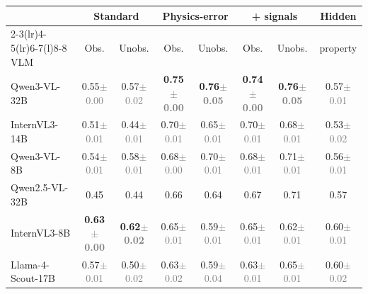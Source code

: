 \begin{table}[t]
    \centering
    \footnotesize
    \setlength{\tabcolsep}{3pt}
    \begin{tabular}{@{}lccccccc@{}}
        \toprule
        & \multicolumn{2}{c}{Standard} & \multicolumn{2}{c}{Physics-error} & \multicolumn{2}{c}{+ signals} & Hidden \\
        \cmidrule(lr){2-3}\cmidrule(lr){4-5}\cmidrule(lr){6-7}\cmidrule(l){8-8}
        VLM & Obs. & Unobs. & Obs. & Unobs. & Obs. & Unobs. & property \\
        \midrule
        Qwen3-VL-32B & 0.55{\scriptsize\textcolor{gray}{$\pm$0.00}} & 0.57{\scriptsize\textcolor{gray}{$\pm$0.02}} & \textbf{0.75{\scriptsize\textcolor{gray}{$\pm$0.00}}} & \textbf{0.76{\scriptsize\textcolor{gray}{$\pm$0.05}}} & \textbf{0.74{\scriptsize\textcolor{gray}{$\pm$0.00}}} & \textbf{0.76{\scriptsize\textcolor{gray}{$\pm$0.05}}} & 0.57{\scriptsize\textcolor{gray}{$\pm$0.01}} \\
        InternVL3-14B & 0.51{\scriptsize\textcolor{gray}{$\pm$0.01}} & 0.44{\scriptsize\textcolor{gray}{$\pm$0.01}} & 0.70{\scriptsize\textcolor{gray}{$\pm$0.01}} & 0.65{\scriptsize\textcolor{gray}{$\pm$0.01}} & 0.70{\scriptsize\textcolor{gray}{$\pm$0.01}} & 0.68{\scriptsize\textcolor{gray}{$\pm$0.01}} & 0.53{\scriptsize\textcolor{gray}{$\pm$0.02}} \\
        Qwen3-VL-8B & 0.54{\scriptsize\textcolor{gray}{$\pm$0.01}} & 0.58{\scriptsize\textcolor{gray}{$\pm$0.01}} & 0.68{\scriptsize\textcolor{gray}{$\pm$0.00}} & 0.70{\scriptsize\textcolor{gray}{$\pm$0.01}} & 0.68{\scriptsize\textcolor{gray}{$\pm$0.01}} & 0.71{\scriptsize\textcolor{gray}{$\pm$0.01}} & 0.56{\scriptsize\textcolor{gray}{$\pm$0.01}} \\
        Qwen2.5-VL-32B & 0.45 & 0.44 & 0.66 & 0.64 & 0.67 & 0.71 & 0.57 \\
        InternVL3-8B & \textbf{0.63{\scriptsize\textcolor{gray}{$\pm$0.00}}} & \textbf{0.62{\scriptsize\textcolor{gray}{$\pm$0.02}}} & 0.65{\scriptsize\textcolor{gray}{$\pm$0.01}} & 0.59{\scriptsize\textcolor{gray}{$\pm$0.01}} & 0.65{\scriptsize\textcolor{gray}{$\pm$0.01}} & 0.62{\scriptsize\textcolor{gray}{$\pm$0.01}} & 0.60{\scriptsize\textcolor{gray}{$\pm$0.01}} \\
        Llama-4-Scout-17B & 0.57{\scriptsize\textcolor{gray}{$\pm$0.01}} & 0.50{\scriptsize\textcolor{gray}{$\pm$0.02}} & 0.63{\scriptsize\textcolor{gray}{$\pm$0.02}} & 0.59{\scriptsize\textcolor{gray}{$\pm$0.04}} & 0.63{\scriptsize\textcolor{gray}{$\pm$0.01}} & 0.65{\scriptsize\textcolor{gray}{$\pm$0.01}} & 0.60{\scriptsize\textcolor{gray}{$\pm$0.02}} \\

\end{tabular}
\end{table}
